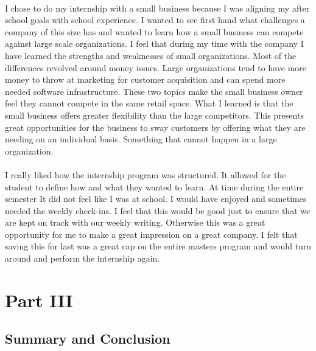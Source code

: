 \documentclass[12pt,titlepage]{article}
\begin{document}
\paragraph {}
I chose to do my internship with a small business because I was aligning my after school goals with school experience. I wanted to see first hand what challenges a company of this size has and wanted to learn how a small business can compete against large scale organizations. I feel that during my time with the company I have learned the strengths and weaknesses of small organizations. Most of the differences revolved around money issues. Large organizations tend to have more money to throw at marketing for customer acquisition and can spend more needed software infrastructure. These two topics make the small business owner feel they cannot compete in the same retail space. What I learned is that the small business offers greater flexibility than the large competitors. This presents great opportunities for the business to sway customers by offering what they are needing on an individual basis. Something that cannot happen in a large organization.
\paragraph {}
I really liked how the internship program was structured. It allowed for the student to define how and what they wanted to learn. At time during the entire semester It did not feel like I was at school. I would have enjoyed and sometimes needed the weekly check-ins. I feel that this would be good just to ensure that we are kept on track with our weekly writing. Otherwise this was a great opportunity for me to make a great impression on a great company. I felt that saving this for last was a great cap on the entire masters program and would turn around and perform the internship again.






\section{Part III}
\subsection{Summary and Conclusion}
\end{document}
